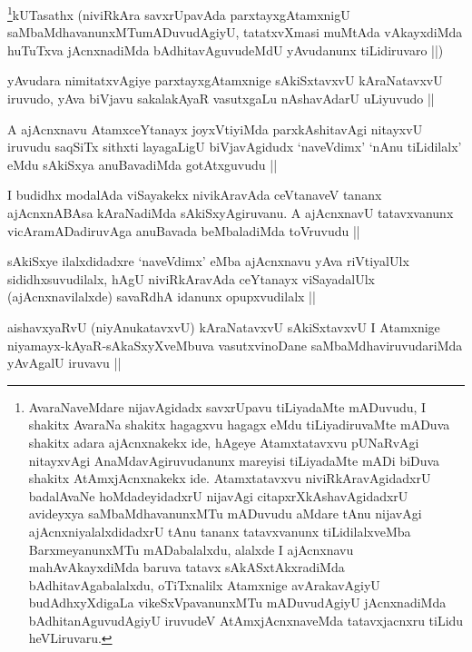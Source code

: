 \begin{artha}
\footnote{AvaraNaveMdare nijavAgidadx savxrUpavu tiLiyadaMte mADuvudu, I shakitx AvaraNa shakitx hagagxvu hagagx eMdu tiLiyadiruvaMte mADuva shakitx adara ajAcnxnakekx ide, hAgeye Atamxtatavxvu pUNaRvAgi nitayxvAgi AnaMdavAgiruvudanunx mareyisi tiLiyadaMte mADi biDuva shakitx AtAmxjAcnxnakekx ide. Atamxtatavxvu niviRkAravAgidadxrU badalAvaNe hoMdadeyidadxrU nijavAgi citapxrXkAshavAgidadxrU avideyxya saMbaMdhavanunxMTu mADuvudu aMdare tAnu nijavAgi ajAcnxniyalalxdidadxrU tAnu tananx tatavxvanunx tiLidilalxveMba BarxmeyanunxMTu mADabalalxdu, alalxde I ajAcnxnavu mahAvAkayxdiMda baruva tatavx sAkASxtAkxradiMda bAdhitavAgabalalxdu, oTiTxnalilx Atamxnige avArakavAgiyU budAdhxyXdigaLa vikeSxVpavanunxMTu mADuvudAgiyU jAcnxnadiMda bAdhitanAguvudAgiyU iruvudeV AtAmxjAcnxnaveMda tatavxjacnxru tiLidu heVLiruvaru.}kUTasathx (niviRkAra savxrUpavAda parxtayxgAtamxnigU saMbaMdhavanunxMTumADuvudAgiyU, tatatxvXmasi muMtAda vAkayxdiMda huTuTxva jAcnxnadiMda bAdhitavAguvudeMdU yAvudanunx tiLidiruvaro ||)
\end{artha}

\begin{artha}
yAvudara nimitatxvAgiye parxtayxgAtamxnige sAkiSxtavxvU kAraNatavxvU iruvudo, yAva biVjavu sakalakAyaR vasutxgaLu nAshavAdarU uLiyuvudo ||
\end{artha}

\begin{artha}
A ajAcnxnavu AtamxceYtanayx joyxVtiyiMda parxkAshitavAgi nitayxvU iruvudu saqSiTx sithxti layagaLigU biVjavAgidudx `naveVdimx' `nAnu tiLidilalx' eMdu sAkiSxya anuBavadiMda gotAtxguvudu ||
\end{artha}

\begin{artha}
I budidhx modalAda viSayakekx nivikAravAda ceVtanaveV tananx ajAcnxnABAsa kAraNadiMda sAkiSxyAgiruvanu. A ajAcnxnavU tatavxvanunx vicAramADadiruvAga anuBavada beMbaladiMda toVruvudu ||
\end{artha}

\begin{artha}
sAkiSxye ilalxdidadxre `naveVdimx' eMba ajAcnxnavu yAva riVtiyalUlx sididhxsuvudilalx, hAgU niviRkAravAda ceYtanayx viSayadalUlx (ajAcnxnavilalxde) savaRdhA idanunx opupxvudilalx ||
\end{artha}

\begin{artha}
aishavxyaRvU (niyAnukatavxvU) kAraNatavxvU sAkiSxtavxvU I Atamxnige niyamayx-kAyaR-sAkaSxyXveMbuva vasutxvinoDane saMbaMdhaviruvudariMda yAvAgalU iruvavu ||
\end{artha}

